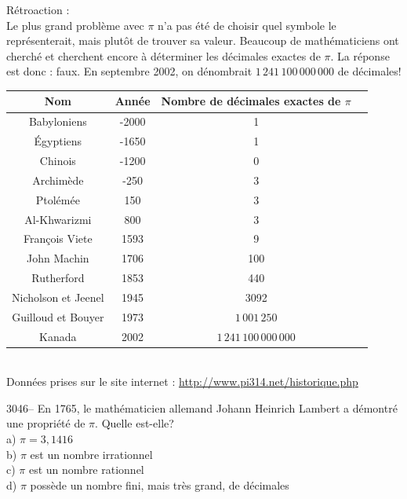 \documentclass[letterpaper, 12pt]{article}
\begin{document}
R\'etroaction :\\
Le plus grand probl\`eme avec $\pi$ n'a pas \'et\'e de choisir quel symbole le repr\'esenterait, mais plut\^ot de trouver sa valeur. Beaucoup de math\'ematiciens ont cherch\'e et cherchent encore \`a d\'eterminer les d\'ecimales exactes de $\pi$. La r\'eponse est donc : faux. En septembre 2002, on d\'enombrait $1 \, 241 \, 100 \, 000 \, 000$ de d\'ecimales!\\
\begin{center}
\begin{tabular}{|c|c|c|c|} \hline
{\bf Nom} & {\bf Ann\'ee} & {\bf Nombre de d\'ecimales exactes de $\pi$} \\ \hline \hline
Babyloniens & -2000 & 1 \\ \hline
\'Egyptiens & -1650 & 1 \\ \hline
Chinois & -1200 & 0 \\ \hline
Archim\`ede & -250 & 3 \\ \hline
Ptol\'em\'ee & 150 & 3 \\ \hline
Al-Khwarizmi & 800 & 3 \\ \hline
Fran\c cois Viete & 1593 & 9 \\ \hline
John Machin & 1706 & 100 \\ \hline
Rutherford & 1853 & 440 \\ \hline
Nicholson et Jeenel & 1945 & 3092 \\ \hline
Guilloud et Bouyer & 1973 & $1 \, 001 \, 250$ \\ \hline
Kanada & 2002 & $1 \, 241 \, 100 \, 000 \, 000$\\ \hline
\end{tabular}\\[2mm]
Donn\'ees prises sur le site internet : \href{http://www.pi314.net/historique.php}{http://www.pi314.net/historique.php}\\[5mm]
\end{center}



3046-- En 1765, le math\'ematicien allemand Johann Heinrich Lambert a d\'emontr\'e une propri\'et\'e de $\pi$. Quelle est-elle?\\

a) $\pi = 3,1416$\\
b) $\pi$ est un nombre irrationnel\\
c) $\pi$ est un nombre rationnel\\
d) $\pi$ poss\`ede un nombre fini, mais tr\`es grand, de d\'ecimales\\
\end{document}
